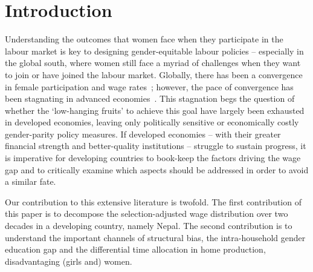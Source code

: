 \section{Introduction}\label{isect1}
Understanding the outcomes that women face when they participate in the labour market is key to designing gender-equitable labour policies -- especially in the global south, where women still face a myriad of challenges when they want to join or have joined the labour market. Globally, there has been a convergence in female participation and wage rates~\citep{WEF2020, OECD2023}; however, the pace of convergence has been stagnating in advanced economies~\citep{Olivetti2016, Blau2017}. This stagnation begs the question of whether the `low-hanging fruits' to achieve this goal have largely been exhausted in developed economies, leaving only politically sensitive or economically costly gender-parity policy measures. If developed economies -- with their greater financial strength and better-quality institutions -- struggle to sustain progress, it is imperative for developing countries to book-keep the factors driving the wage gap and to critically examine which aspects should be addressed in order to avoid a similar fate.\par

Our contribution to this extensive literature is twofold. The first contribution of this paper is to decompose the selection-adjusted wage distribution over two decades in a developing country, namely Nepal. The second contribution is to understand the important channels of structural bias, the intra-household gender education gap and the differential time allocation in home production, disadvantaging (girls and) women.\par

